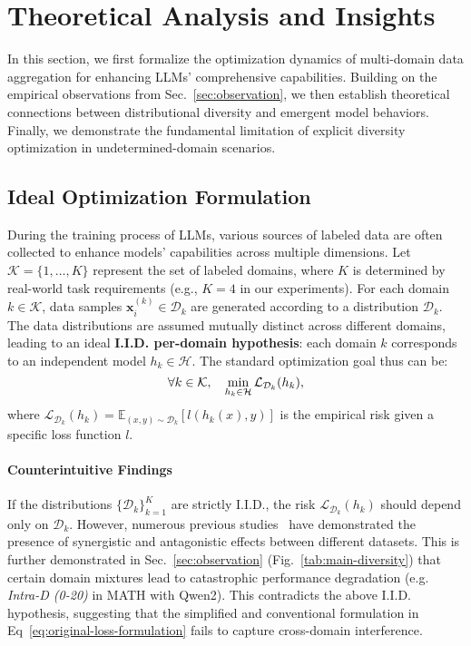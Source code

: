 \section{Theoretical Analysis and Insights}
\label{sec:theory}

In this section, we first formalize the optimization dynamics of multi-domain data aggregation for enhancing LLMs' comprehensive capabilities. Building on the empirical observations from Sec.~\ref{sec:observation}, we then establish theoretical connections between distributional diversity and emergent model behaviors. Finally, we demonstrate the fundamental limitation of explicit diversity optimization in undetermined-domain scenarios.

\subsection{Ideal Optimization Formulation}

During the training process of LLMs, various sources of labeled data are often collected to enhance models' capabilities across multiple dimensions. Let \(\mathcal{K} = \{1, \ldots, K\}\) represent the set of labeled domains, where \(K\) is determined by real-world task requirements (e.g., \(K=4\) in our experiments). For each domain \(k \in \mathcal{K}\), data samples \(\mathbf{x}_i^{(k)} \in \mathcal{D}_k\) are generated according to a distribution \(\mathcal{D}_k\). The data distributions are assumed mutually distinct across different domains, leading to an ideal \textbf{I.I.D. per-domain hypothesis}: each domain \(k\) corresponds to an independent model \(h_k \in \mathcal{H}\). The standard optimization goal thus can be:
\begin{equation}
\small
\label{eq:original-loss-formulation}
    \forall k \in \mathcal{K}, \quad \min_{h_k \in \mathcal{H}} \mathcal{L}_{\mathcal{D}_k}(h_k),
\end{equation}
where \(\mathcal{L}_{\mathcal{D}_k}(h_k) = \mathbb{E}_{(x,y) \sim \mathcal{D}_k} \left[ l(h_k(x), y) \right]\) is the empirical risk given a specific loss function \(l\).

\paragraph{Counterintuitive Findings}
If the distributions \(\{\mathcal{D}_k\}_{k=1}^K\) are strictly I.I.D., the risk \(\mathcal{L}_{\mathcal{D}_k}(h_k)\) should depend only on \(\mathcal{D}_k\). However, numerous previous studies~\cite{zhao2024beyond, tirumala2023d4} have demonstrated the presence of synergistic and antagonistic effects between different datasets. This is further demonstrated in Sec.~\ref{sec:observation} (Fig.~\ref{tab:main-diversity}) that certain domain mixtures lead to catastrophic performance degradation (e.g. \textit{Intra-D (0-20)} in MATH with Qwen2). This contradicts the above I.I.D. hypothesis, suggesting that the simplified and conventional formulation in Eq~\eqref{eq:original-loss-formulation} fails to capture cross-domain interference.

